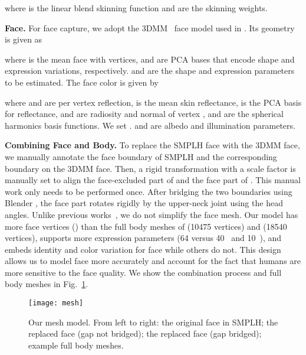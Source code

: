 \documentclass[final]{cvpr}
\begin{document}
where  is the linear blend skinning function and  are the skinning weights.
\par
\noindent \textbf{Face.}
For face capture, we adopt the 3DMM~\cite{blanz1999a} face model used in \cite{tewari2017mofa}.
Its geometry is given as

where  is the mean face with  vertices,  and  are PCA bases that encode shape and expression variations, respectively.
 and  are the shape and expression parameters to be estimated.
The face color is given by


where  and  are per vertex reflection,  is the mean skin reflectance,  is the PCA basis for reflectance,  and  are radiosity and normal of vertex , and  are the spherical harmonics basis functions.
We set .
 and  are albedo and illumination parameters.
\par
\noindent \textbf{Combining Face and Body.}
To replace the SMPLH face with the 3DMM face, we manually annotate the face boundary  of SMPLH and the corresponding boundary  on the 3DMM face.
Then, a rigid transformation with a scale factor is manually set to align the face-excluded part of  and the face part of .
This manual work only needs to be performed once.
After bridging the two boundaries using Blender \cite{blender}, the face part rotates rigidly by the upper-neck joint using the head angles.
Unlike previous works~\cite{pavlakos2019expressive,joo2018total}, we do not simplify the face mesh.
Our model has more face vertices () than the full body meshes of \cite{choutas2020monocular,pavlakos2019expressive} (10475 vertices) and \cite{joo2018total,xiang2019monocular} (18540 vertices), supports more expression parameters (64 versus 40~\cite{joo2018total,xiang2019monocular} and 10~\cite{choutas2020monocular,pavlakos2019expressive}), and embeds identity and color variation for face while others do not.
This design allows us to model face more accurately and account for the fact that humans are more sensitive to the face quality.
We show the combination process and full body meshes in Fig.~\ref{fig:mesh}.
\begin{figure}[t]
  \centering
  \texttt{[image: mesh]}
  \caption{
Our mesh model.
From left to right:
the original face in SMPLH;
the replaced face (gap not bridged);
the replaced face (gap bridged);
example full body meshes.
}
  \label{fig:mesh}
\end{figure}
\end{document}
